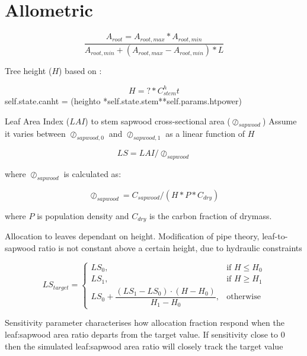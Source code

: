 \section{Allometric}
\label{Allometric}

\begin{equation}
	\frac{A_{root}=A_{root,max}*A_{root,min}}{A_{root,min}+(A_{root,max}-A_{root,min})*L}
\end{equation}

Tree height ($H$) based on \citet{Causton1985}:

\begin{equation}
	H = ? * C_{stem} ^ ht
\end{equation}
self.state.canht = (heighto *self.state.stem**self.params.htpower)
                                
Leaf Area Index ($LAI$) to stem sapwood cross-sectional area ($\oslash_{sapwood}$)
Assume it varies between $\oslash_{sapwood,0}$ and $\oslash_{sapwood,1}$ as a linear function of $H$ 

\begin{equation}
	LS = LAI / \oslash_{sapwood}
\end{equation}

where $\oslash_{sapwood}$ is calculated as:

\begin{equation}
	\oslash_{sapwood} = C_{sapwood}/(H * P *C_{dry} )
\end{equation}

where $P$ is population density and $C_{dry}$ is the carbon fraction of drymass.

Allocation to leaves dependant on height. Modification of pipe theory, leaf-to-sapwood ratio is not constant above a certain  height, due to hydraulic constraints \citep{Magnani2000,Deckmun2006}

\begin{equation}
	LS_{target}=
	\begin{cases}
		    LS_{0},& \text{if } H\le H_{0} \\ 
		    LS_{1},& \text{if } H\ge H_{1} \\
		    LS_{0} + \dfrac{(LS_{1}-LS_{0})\cdot (H-H_{0})}{H_{1}-H_{0}},& \text{otherwise}
		\end{cases}
\end{equation}

Sensitivity parameter characterises how allocation fraction respond when the leaf:sapwood area ratio departs from the target value. If sensitivity close to 0 then the simulated leaf:sapwood area ratio will closely track the target value

